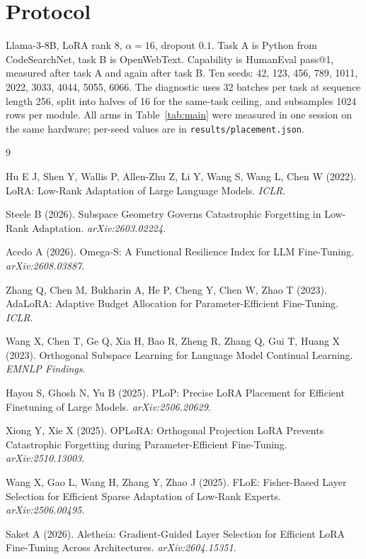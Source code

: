 \documentclass[11pt]{article}
\begin{document}
\appendix
\section{Protocol}
\label{app:proto}

Llama-3-8B, LoRA rank 8, $\alpha = 16$, dropout $0.1$. Task A is Python from
CodeSearchNet, task B is OpenWebText. Capability is HumanEval pass@1, measured
after task A and again after task B. Ten seeds: 42, 123, 456, 789, 1011, 2022,
3033, 4044, 5055, 6066. The diagnostic uses 32 batches per task at sequence
length 256, split into halves of 16 for the same-task ceiling, and subsamples
1024 rows per module. All arms in Table~\ref{tab:main} were measured in one
session on the same hardware; per-seed values are in
\texttt{results/placement.json}.

\begin{thebibliography}{9}

Hu E J, Shen Y, Wallis P, Allen-Zhu Z, Li Y, Wang S, Wang L, Chen W (2022).
LoRA: Low-Rank Adaptation of Large Language Models.
\emph{ICLR}.

Steele B (2026).
Subspace Geometry Governs Catastrophic Forgetting in Low-Rank Adaptation.
\emph{arXiv:2603.02224}.

Acedo A (2026).
Omega-S: A Functional Resilience Index for LLM Fine-Tuning.
\emph{arXiv:2608.03887}.

Zhang Q, Chen M, Bukharin A, He P, Cheng Y, Chen W, Zhao T (2023).
AdaLoRA: Adaptive Budget Allocation for Parameter-Efficient Fine-Tuning.
\emph{ICLR}.

Wang X, Chen T, Ge Q, Xia H, Bao R, Zheng R, Zhang Q, Gui T, Huang X (2023).
Orthogonal Subspace Learning for Language Model Continual Learning.
\emph{EMNLP Findings}.

Hayou S, Ghosh N, Yu B (2025).
PLoP: Precise LoRA Placement for Efficient Finetuning of Large Models.
\emph{arXiv:2506.20629}.

Xiong Y, Xie X (2025).
OPLoRA: Orthogonal Projection LoRA Prevents Catastrophic Forgetting during
Parameter-Efficient Fine-Tuning.
\emph{arXiv:2510.13003}.

Wang X, Gao L, Wang H, Zhang Y, Zhao J (2025).
FLoE: Fisher-Based Layer Selection for Efficient Sparse Adaptation of Low-Rank
Experts.
\emph{arXiv:2506.00495}.

Saket A (2026).
Aletheia: Gradient-Guided Layer Selection for Efficient LoRA Fine-Tuning Across
Architectures.
\emph{arXiv:2604.15351}.


\end{thebibliography}
\end{document}
